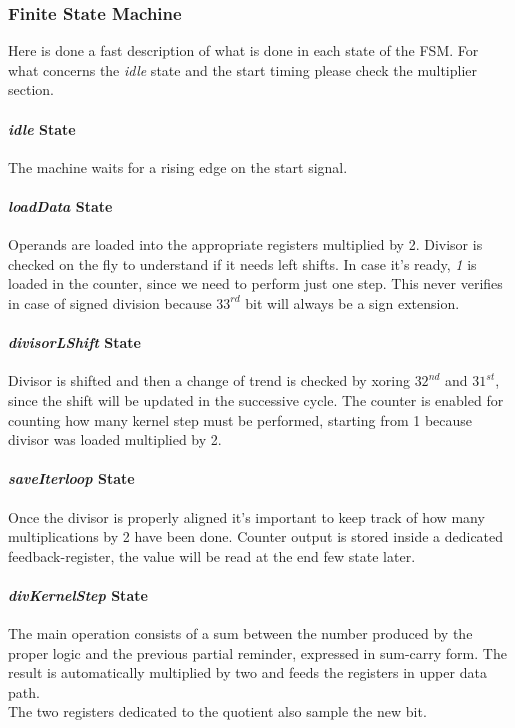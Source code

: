 \subsubsection{Finite State Machine}
Here is done a fast description of what is done in each state of the FSM. For what concerns the \textit{idle} state and the start timing please check the multiplier section.
\paragraph{\textit{idle} State}
The machine waits for a rising edge on the start signal.
\paragraph{\textit{loadData} State}
Operands are loaded into the appropriate registers multiplied by 2. Divisor is checked on the fly to understand if it needs left shifts. In case it's ready, \textit{1} is loaded in the counter, since we need to perform just one step. This never verifies in case of signed division because $33^{rd}$ bit will always be a sign extension. 
\paragraph{\textit{divisorLShift} State}
Divisor is shifted and then a change of trend is checked by xoring $32^{nd}$ and $31^{st}$, since the shift will be updated in the successive cycle. The counter is enabled for counting how many kernel step must be performed, starting from 1 because divisor was loaded multiplied by 2.
\paragraph{\textit{saveIterloop} State}
Once the divisor is properly aligned it's important to keep track of how many multiplications by 2 have been done. Counter output is stored inside a dedicated feedback-register, the value will be read at the end few state later.
\paragraph{\textit{divKernelStep} State}
The main operation consists of a sum between the number produced by the proper logic and the previous partial reminder, expressed in sum-carry form. The result is automatically multiplied by two and feeds the registers in upper data path.\\
The two registers dedicated to the quotient also sample the new bit.
